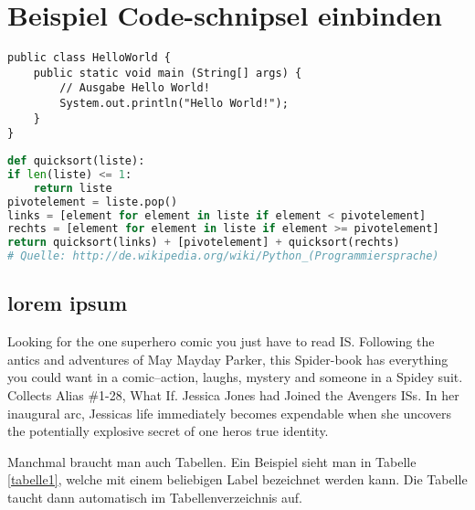 
\chapter{Beispiel Code-schnipsel einbinden}


\begin{lstlisting}[caption=Code-Beispiel, label=Bsp.1]
public class HelloWorld {
	public static void main (String[] args) {
		// Ausgabe Hello World!
		System.out.println("Hello World!");
	}
}
\end{lstlisting}

\begin{lstlisting}[caption=Python-Code, label=Python-Code, title=Titel des Python-Codes,language=Python]
def quicksort(liste):
if len(liste) <= 1:
	return liste
pivotelement = liste.pop()
links = [element for element in liste if element < pivotelement]
rechts = [element for element in liste if element >= pivotelement]
return quicksort(links) + [pivotelement] + quicksort(rechts)
# Quelle: http://de.wikipedia.org/wiki/Python_(Programmiersprache)
\end{lstlisting}

\section{lorem ipsum}
Looking for the one superhero comic you just have to read \ac{IS}.
Following the antics and adventures of May Mayday Parker, this Spider-book has everything you could want in a comic--action, laughs, mystery and someone in a Spidey suit.
Collects Alias \#1-28, What If. Jessica Jones had Joined the Avengers \acp{IS}.
In her inaugural arc, Jessicas life immediately becomes expendable when she uncovers the potentially explosive secret of one heros true identity.

Manchmal braucht man auch Tabellen. 
Ein Beispiel sieht man in Tabelle \ref{tabelle1}, welche mit einem beliebigen Label bezeichnet werden kann. 
Die Tabelle taucht dann automatisch im Tabellenverzeichnis auf.

\begin{table}[ht!]
	\caption{Test der Funktion der Tabelle und ihrer Darstellung}
	\label{tabelle1}
\end{table}


